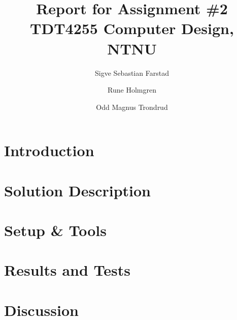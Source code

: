 


\title{Report for Assignment \#2 \\
TDT4255 Computer Design, NTNU}
\author{Sigve Sebastian Farstad \and
		Rune Holmgren \and
		Odd Magnus Trondrud}




\maketitle


\begin{abstract}
	
\end{abstract}

\tableofcontents

\listoffigures

\listoftables

\chapter{Introduction}


	

\chapter{Solution Description}
	

\chapter{Setup \& Tools}
	

\chapter{Results and Tests}
	

\chapter{Discussion}
	

